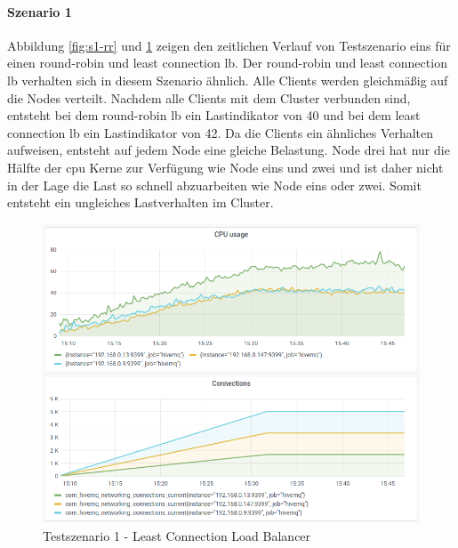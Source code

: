 \paragraph{Szenario 1}
Abbildung \ref{fig:s1-rr} und \ref{fig:s1-lc} zeigen den zeitlichen Verlauf von Testszenario eins für einen round-robin und least connection \acl{lb}.
Der round-robin und least connection \ac{lb} verhalten sich in diesem Szenario ähnlich. Alle Clients werden gleichmä{\ss}ig auf die Nodes verteilt.
Nachdem alle Clients mit dem Cluster verbunden sind, entsteht bei dem round-robin \ac{lb} ein Lastindikator von 40 und bei dem least connection \ac{lb} ein Lastindikator von 42.
Da die Clients ein ähnliches Verhalten aufweisen, entsteht auf jedem Node eine gleiche Belastung. Node drei hat nur die Hälfte der \ac{cpu} Kerne zur Verfügung wie Node eins und zwei und ist daher nicht in der Lage die Last so schnell abzuarbeiten wie Node eins oder zwei. Somit entsteht ein ungleiches Lastverhalten im Cluster.
\begin{figure}
    \centering
    \includegraphics[scale=0.8]{images/s1_lc.png}
    \caption{Testszenario 1 - Least Connection Load Balancer}
    \label{fig:s1-lc}
\end{figure}
